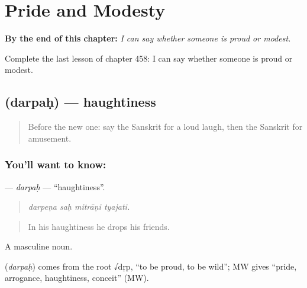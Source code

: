 
\chapter{Pride and Modesty}
\label{ch:sa-pride-and-modesty}

\begin{chapteropening}
\textbf{By the end of this chapter:} \emph{I can say whether someone is proud or modest.}

Complete the last lesson of chapter 458: I can say whether someone is proud or modest.
\end{chapteropening}

\section[\texorpdfstring{\sk{दर्पः} (darpaḥ)}{दर्पः (darpaḥ)}]{ (darpaḥ) — haughtiness}

\label{lesson:SA-C458-darpah}



\begin{quote}
Before the new one: say the Sanskrit for a loud laugh, then the Sanskrit for amusement.
\end{quote}

\subsection*{You'll want to know: }
\textbf{} — \emph{darpaḥ} — \textquotedblleft{}haughtiness\textquotedblright{}.

\begin{quote}
   
\end{quote}

\begin{quote}
\emph{darpeṇa saḥ mitrāṇi tyajati.}
\end{quote}

\begin{quote}
In his haughtiness he drops his friends.
\end{quote}

A masculine noun.

\begin{cousinweb}
\textbf{} (\emph{darpaḥ}) comes from the root √dṛp, \textquotedblleft{}to be proud, to be wild\textquotedblright{}; MW gives \textquotedblleft{}pride, arrogance, haughtiness, conceit\textquotedblright{} (MW).
\end{cousinweb}

